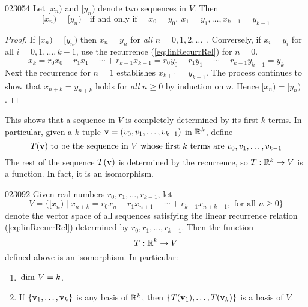 \begin{lemma}{}{023054}
Let  $[x_n)$  and $[y_n)$ denote two sequences in $V$. Then
\begin{equation*}
[x_n) = [y_n) \quad \mbox{if and only if } \quad x_0 = y_0, \ x_1 = y_1, \dots, x_{k-1} = y_{k-1}
\end{equation*}
\end{lemma}

\begin{proof}
If $[x_{n}) = [y_{n})$ then $x_{n} = y_{n}$ for \textit{all} $n = 0, 1, 2, \dots$\ . Conversely, if $x_{i} = y_{i}$ for all $i = 0, 1, \dots, k - 1$, use the recurrence (\ref{eq:linRecurrRel}) for $n = 0$.
\begin{equation*}
x_{k} = r_{0}x_{0} + r_{1}x_{1} + \cdots + r_{k-1}x_{k-1} = r_{0}y_{0} + r_{1}y_{1} + \cdots + r_{k-1}y_{k-1} = y_{k}
\end{equation*}
Next the recurrence for $n = 1$ establishes $x_{k+1} = y_{k+1}$. The process continues to show that $x_{n+k} = y_{n+k}$ holds for \textit{all} $n \geq 0$ by induction on $n$. Hence $[x_{n}) = [y_{n})$.
\end{proof}

This shows that a sequence in $V$ is completely determined by its first $k$ terms. In particular, given a $k$-tuple $\textbf{v} = (v_{0}, v_{1}, \dots, v_{k-1})$ in $\mathbb{R}^k$, define
\begin{equation*}
T(\textbf{v}) \mbox{ to be the sequence in } V \mbox{ whose first } k \mbox{ terms are } v_0, v_1, \dots, v_{k-1}
\end{equation*}
The rest of the sequence $T(\textbf{v})$ is determined by the recurrence, so $T : \mathbb{R}^k \to V$ is a function. In fact, it is an isomorphism.


\begin{theorem}{}{023092}
Given real numbers $r_{0}, r_{1}, \dots, r_{k-1}$, let
\begin{equation*}
V = \{[x_n) \mid x_{n+k} = r_{0}x_{n} + r_{1}x_{n+1} + \cdots + r_{k-1}x_{n+k-1}, \mbox{ for all } n \geq 0\}
\end{equation*}
denote the vector space of all sequences satisfying the linear recurrence relation (\ref{eq:linRecurrRel}) determined by $r_{0}, r_{1}, \dots, r_{k-1}$. Then the function
\begin{equation*}
T : \mathbb{R}^k \to V
\end{equation*}
defined above is an isomorphism. In particular:

\begin{enumerate}
\item $\thinspace\operatorname{dim \medspace}V = k$.

\item If $\{\textbf{v}_{1}, \dots, \textbf{v}_{k}\}$ is any basis of $\mathbb{R}^k$, then $\{T(\textbf{v}_{1}), \dots, T(\textbf{v}_{k})\}$ is a basis of $V$.

\end{enumerate}
\end{theorem}

